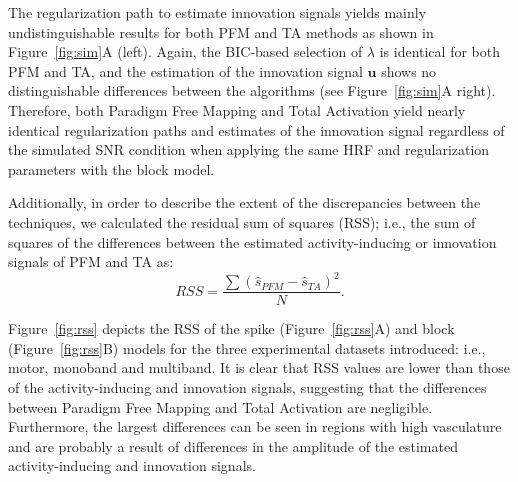 The regularization path to estimate innovation signals yields mainly undistinguishable results for both PFM and TA methods as shown in Figure~\ref{fig:sim}A (left). Again, the BIC-based selection of \(\lambda\) is identical for both PFM and TA, and the estimation of the innovation signal \(\mathbf{u}\) shows no distinguishable differences between the algorithms (see Figure~\ref{fig:sim}A right). Therefore, both Paradigm Free Mapping and Total Activation yield nearly identical regularization paths and estimates of the innovation signal regardless of the simulated SNR condition when applying the same HRF and regularization parameters with the block model.


Additionally, in order to describe the extent of the discrepancies between the techniques, we calculated the residual sum of squares (RSS); i.e., the sum of squares of the differences between the estimated activity-inducing or innovation signals of PFM and TA as:
\begin{equation}
    RSS = \frac{\sum{(\hat{s}_{PFM} - \hat{s}_{TA})^2}}{N}.
\end{equation}

Figure~\ref{fig:rss} depicts the RSS of the spike (Figure~\ref{fig:rss}A) and block (Figure~\ref{fig:rss}B) models for the three experimental datasets introduced: i.e., motor, monoband and multiband. It is clear that RSS values are lower than those of the activity-inducing and innovation signals, suggesting that the differences between Paradigm Free Mapping and Total Activation are negligible. Furthermore, the largest differences can be seen in regions with high vasculature and are probably a result of differences in the amplitude of the estimated activity-inducing and innovation signals.
